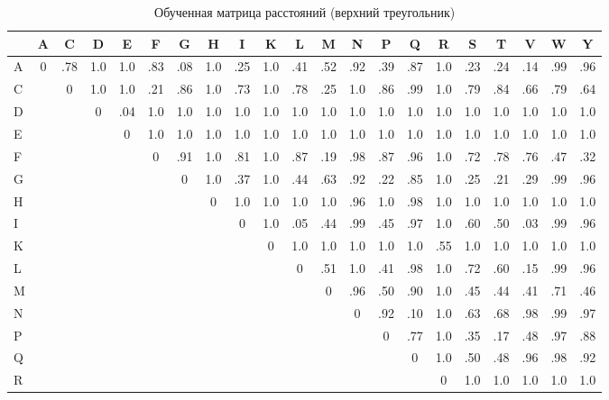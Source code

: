 \documentclass[12pt]{article}
\begin{document}
\begin{table}[h]
\centering
\caption{Обученная матрица расстояний (верхний треугольник)}
\label{tab:distance_matrix}
\small
\begin{tabular}{lcccccccccccccccccccc}
\toprule
 & A & C & D & E & F & G & H & I & K & L & M & N & P & Q & R & S & T & V & W & Y \\
\midrule
A & 0 & .78 & 1.0 & 1.0 & .83 & .08 & 1.0 & .25 & 1.0 & .41 & .52 & .92 & .39 & .87 & 1.0 & .23 & .24 & .14 & .99 & .96 \\
C &   & 0 & 1.0 & 1.0 & .21 & .86 & 1.0 & .73 & 1.0 & .78 & .25 & 1.0 & .86 & .99 & 1.0 & .79 & .84 & .66 & .79 & .64 \\
D &   &   & 0 & .04 & 1.0 & 1.0 & 1.0 & 1.0 & 1.0 & 1.0 & 1.0 & 1.0 & 1.0 & 1.0 & 1.0 & 1.0 & 1.0 & 1.0 & 1.0 & 1.0 \\
E &   &   &   & 0 & 1.0 & 1.0 & 1.0 & 1.0 & 1.0 & 1.0 & 1.0 & 1.0 & 1.0 & 1.0 & 1.0 & 1.0 & 1.0 & 1.0 & 1.0 & 1.0 \\
F &   &   &   &   & 0 & .91 & 1.0 & .81 & 1.0 & .87 & .19 & .98 & .87 & .96 & 1.0 & .72 & .78 & .76 & .47 & .32 \\
G &   &   &   &   &   & 0 & 1.0 & .37 & 1.0 & .44 & .63 & .92 & .22 & .85 & 1.0 & .25 & .21 & .29 & .99 & .96 \\
H &   &   &   &   &   &   & 0 & 1.0 & 1.0 & 1.0 & 1.0 & .96 & 1.0 & .98 & 1.0 & 1.0 & 1.0 & 1.0 & 1.0 & 1.0 \\
I &   &   &   &   &   &   &   & 0 & 1.0 & .05 & .44 & .99 & .45 & .97 & 1.0 & .60 & .50 & .03 & .99 & .96 \\
K &   &   &   &   &   &   &   &   & 0 & 1.0 & 1.0 & 1.0 & 1.0 & 1.0 & .55 & 1.0 & 1.0 & 1.0 & 1.0 & 1.0 \\
L &   &   &   &   &   &   &   &   &   & 0 & .51 & 1.0 & .41 & .98 & 1.0 & .72 & .60 & .15 & .99 & .96 \\
M &   &   &   &   &   &   &   &   &   &   & 0 & .96 & .50 & .90 & 1.0 & .45 & .44 & .41 & .71 & .46 \\
N &   &   &   &   &   &   &   &   &   &   &   & 0 & .92 & .10 & 1.0 & .63 & .68 & .98 & .99 & .97 \\
P &   &   &   &   &   &   &   &   &   &   &   &   & 0 & .77 & 1.0 & .35 & .17 & .48 & .97 & .88 \\
Q &   &   &   &   &   &   &   &   &   &   &   &   &   & 0 & 1.0 & .50 & .48 & .96 & .98 & .92 \\
R &   &   &   &   &   &   &   &   &   &   &   &   &   &   & 0 & 1.0 & 1.0 & 1.0 & 1.0 & 1.0 \\

\end{tabular}
\end{table}
\end{document}
